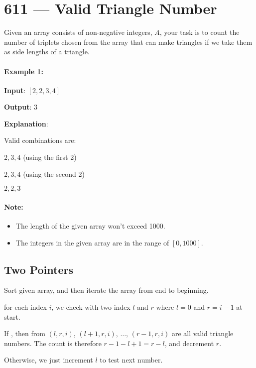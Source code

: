 \section{611 --- Valid Triangle Number}
Given an array consists of non-negative integers,  $A$, your task is to count the number of triplets chosen from the array that can make triangles if we take them as side lengths of a triangle.

\paragraph{Example 1:}

\begin{flushleft}
\item \textbf{Input}: $[2,2,3,4]$

\textbf{Output}: 3

\textbf{Explanation}:

Valid combinations are: 

$2,3,4$ (using the first 2)

$2,3,4$ (using the second 2)

$2,2,3$

\end{flushleft}

\paragraph{Note:}

\begin{itemize}
\item The length of the given array won't exceed 1000.
\item The integers in the given array are in the range of $[0, 1000]$.
\end{itemize}

\subsection{Two Pointers}
Sort given array, and then iterate the array from end to beginning.

for each index $i$, we check with two index $l$ and $r$ where $l=0$ and $r=i-1$ at start. 

If , then from $(l, r, i)$, $(l+1,r,i)$, $\ldots$, $(r-1,r,i)$ are all valid triangle numbers. The count is therefore $r-1-l+1=r-l$, and decrement $r$.

Otherwise, we just increment $l$ to test next number.

